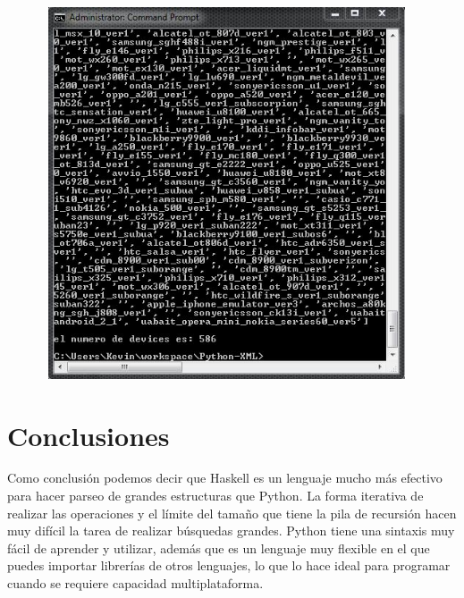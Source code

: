 \documentclass[11pt]{article} %
\begin{document}
\includegraphics[width=13cm,height=11cm]{imagenes/numeroresultado.jpg}


\section{Conclusiones}

Como conclusión podemos decir que Haskell es un lenguaje mucho más efectivo para hacer parseo de grandes estructuras que Python. La forma iterativa de realizar las operaciones y el límite del tamaño que tiene la pila de recursión hacen muy difícil la tarea de realizar búsquedas grandes.
Python tiene una sintaxis muy fácil de aprender y utilizar, además que es un lenguaje muy flexible en el que puedes importar librerías de otros lenguajes, lo que lo hace ideal para programar cuando se requiere capacidad multiplataforma.













  
\end{document}
